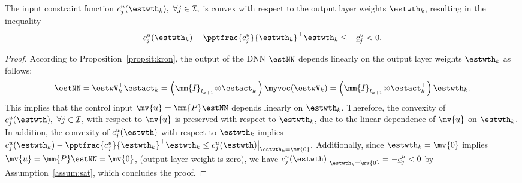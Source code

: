 \documentclass[letterpaper, journal, twoside]{IEEEtran}
\begin{document}
\begin{lem} \label{lem:convexity:input:constraint}
  The input constraint function $c_j^{u}(\estwth_k),\ \forall j \in \mathcal{I},$ is convex with respect to the output layer weights $\estwth_k$, resulting in the inequality 
  \begin{equation*}
    c_j^{u}(\estwth_k) 
    - 
    \pptfrac{c_j^{u}}{\estwth_k}^\top 
    \estwth_k 
    \le 
    - \underline{c}_j^{u}
    <
    0
    .
  \end{equation*}
\end{lem}

\begin{proof}
  According to Proposition~\ref{propsit:kron}, the output of the DNN $\estNN$ depends linearly on the output layer weights $\estwth_k$ as follows:
  \begin{equation} \label{eq:NN:linear}
    \estNN
    =
    \estwV_k^\top
    \estact_k
    = 
    \left(
      \mm{I}_{l_{k+1}}
      \!
      \otimes
      \! 
      \estact_k^\top
    \right)
    \myvec(\estwV_k)
    = 
    \left(
      \mm{I}_{l_{k+1}} 
      \!
      \otimes 
      \!
      \estact_k^\top
    \right)
    \estwth_k
    .
  \end{equation}
  This implies that the control input $\mv{u}=\mm{P}\estNN$ depends linearly on $\estwth_k$.
  Therefore, the convexity of $c_j^u(\estwth),\ \forall j \in \mathcal{I}$, with respect to $\mv{u}$ is preserved with respect to $\estwth_k$, due to the linear dependence of $\mv{u}$ on $\estwth_k$.
  In addition, the convexity of $c_j^u(\estwth)$ with respect to $\estwth_k$ implies 
  $
    c_j^{u}(\estwth_k) 
    - 
    \pptfrac{c_j^{u}}{\estwth_k}^\top 
    \estwth_k 
    \le 
    c_j^{u}(\estwth)\big|_{\estwth_k=\mv{0}}
    .
  $
  Additionally, since $\estwth_k=\mv{0}$ implies $\mv{u}=\mm{P}\estNN=\mv{0}$, (\ie output layer weight is zero), we have $c_j^{u}(\estwth)\big|_{\estwth_k=\mv{0}}=-\underline{c}_j^{u}<0$ by Assumption~\ref{assum:sat}, which concludes the proof.
\end{proof}
\end{document}
